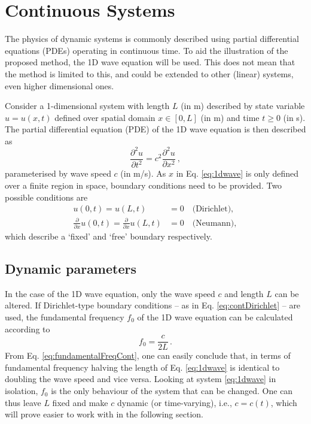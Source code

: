 \documentclass[dvipsnames, reprint]{JASA}
\def\SWcomment[#1]{\textcolor{Bittersweet}{#1}}
\begin{document}
\section{Continuous Systems}\label{sec:continuous}
%
%
%
The physics of dynamic systems is commonly described using partial differential equations (PDEs) operating in continuous time. To aid the illustration of the proposed method, the 1D wave equation will be used. \SWcomment[This does not mean that the method is limited to this, and could be extended to other (linear) systems, even higher dimensional ones.]

Consider a 1-dimensional system with length $L$ (in m) described by state variable $u = u(x, t)$ defined over spatial domain $x \in [0, L]$ (in m) and time $t \geq 0$ (in s). The partial differential equation (PDE) of the 1D wave equation is then described as
\begin{equation}\label{eq:1dwave}
    \frac{\partial^2 u}{\partial t^2}= c^2\frac{\partial^2 u}{\partial x^2}\ ,
\end{equation}
parameterised by wave speed $c$ (in m/s). As $x$ in Eq. \eqref{eq:1dwave} is only defined over a finite region in space, boundary conditions need to be provided. Two possible conditions are
\begin{subequations}\label{eq:continuousBoundaries}
    \begin{align}
        u(0, t) = u(L, t) &= 0\quad \text{(Dirichlet)},\label{eq:contDirichlet}\\
        \frac{\partial}{\partial x} u(0, t) = \frac{\partial}{\partial x} u(L, t) &= 0\quad \text{(Neumann)},\label{eq:contNeumann}
    \end{align}
\end{subequations}
which describe a `fixed' and `free' boundary respectively.

\subsection{Dynamic parameters}
In the case of the 1D wave equation, only the wave speed $c$ and length $L$ can be altered. If Dirichlet-type boundary conditions -- as in Eq. \eqref{eq:contDirichlet} -- are used, the fundamental frequency $f_0$ of the 1D wave equation can be calculated according to
\begin{equation}\label{eq:fundamentalFreqCont}
    f_0 = \frac{c}{2L}\,.
\end{equation}
From Eq. \eqref{eq:fundamentalFreqCont}, one can easily conclude that, in terms of fundamental frequency halving the length of Eq. \eqref{eq:1dwave} is identical to doubling the wave speed and vice versa. Looking at system \eqref{eq:1dwave} in isolation, $f_0$ is the only behaviour of the system that can be changed. One can thus leave $L$ fixed %
and make $c$ dynamic (or time-varying), i.e., $c = c(t)$, which will prove easier to work with in the following section.
\end{document}
